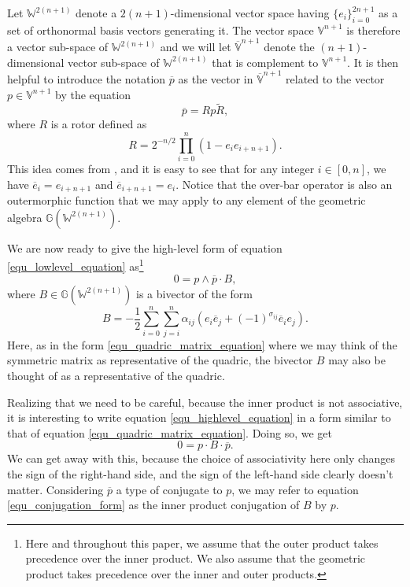 \documentclass{ecgd-l}
\theoremstyle{definition}
\theoremstyle{remark}
\numberwithin{equation}{section}
\newcommand{\G}{\mathbb{G}}
\newcommand{\V}{\mathbb{V}}
\newcommand{\Vb}{\mathbb{\overline{V}}}
\newcommand{\W}{\mathbb{W}}
\begin{document}
Let $\W^{2(n+1)}$ denote a $2(n+1)$-dimensional vector space
having $\{e_i\}_{i=0}^{2n+1}$ as a set of orthonormal basis vectors
generating it.  The vector space $\V^{n+1}$ is therefore a vector
sub-space of $\W^{2(n+1)}$ and we will let $\Vb^{n+1}$ denote
the $(n+1)$-dimensional vector sub-space of $\W^{2(n+1)}$ that
is complement to $\V^{n+1}$.  It is then helpful to introduce the
notation $\overline{p}$ as the vector in $\Vb^{n+1}$ related to the
vector $p\in\V^{n+1}$ by the equation
\begin{equation}
\overline{p} = Rp\tilde{R},
\end{equation}
where $R$ is a rotor defined as
\begin{equation}
R = 2^{-n/2}\prod_{i=0}^n\left(1-e_ie_{i+n+1}\right).
\end{equation}
This idea comes from \cite{DoranHestenes93}, and it is easy to see
that for any integer $i\in[0,n]$, we have $\overline{e}_i=e_{i+n+1}$
and $\overline{e}_{i+n+1}=e_i$.  Notice that the over-bar operator
is also an outermorphic function that we may apply to any element
of the geometric algebra $\G(\W^{2(n+1)})$.

We are now ready to give the high-level form of equation \eqref{equ_lowlevel_equation}
as\footnote{Here and throughout this paper, we assume that the outer product takes
precedence over the inner product.  We also assume that the geometric product takes
precedence over the inner and outer products.}
\begin{equation}\label{equ_highlevel_equation}
0 = p\wedge\overline{p}\cdot B,
\end{equation}
where $B\in\G(\W^{2(n+1)})$ is a bivector of the form
\begin{equation}
B = -\frac{1}{2}\sum_{i=0}^n\sum_{j=i}^n\alpha_{ij}(e_i\overline{e}_j+(-1)^{\sigma_{ij}}\overline{e}_ie_j).
\end{equation}
Here, as in the form \eqref{equ_quadric_matrix_equation} where we may think of
the symmetric matrix as representative of the quadric, the bivector $B$ may also be thought
of as a representative of the quadric.

Realizing that we need to be careful, because the inner product is not associative,
it is interesting to write equation \eqref{equ_highlevel_equation} in a form
similar to that of equation \eqref{equ_quadric_matrix_equation}.  Doing so, we get
\begin{equation}\label{equ_conjugation_form}
0 = p\cdot B\cdot\overline{p}.
\end{equation}
We can get away with this, because the choice of associativity here only changes
the sign of the right-hand side, and the sign of the left-hand side clearly doesn't matter.
Considering $\overline{p}$ a type of conjugate to $p$, we may refer to equation
\eqref{equ_conjugation_form} as the inner product conjugation of $B$ by $p$.
\end{document}
